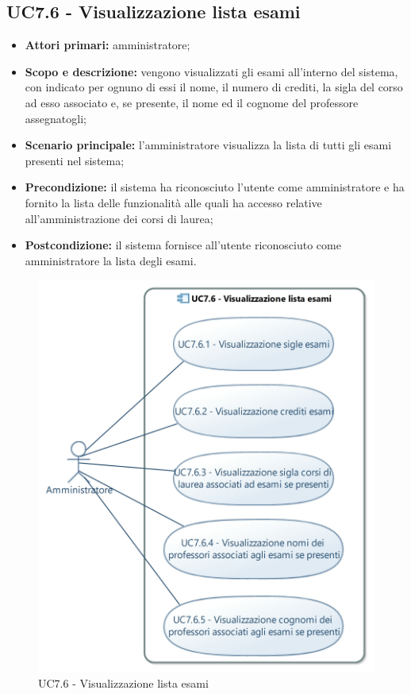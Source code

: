 \documentclass[AnalisiDeiRequisiti.tex]{subfiles}
\begin{document}
\subsection{UC7.6 - Visualizzazione lista esami}
\begin{itemize}
	\item \textbf{Attori primari:} amministratore;
	\item \textbf{Scopo e descrizione:} vengono visualizzati gli esami all'interno del sistema, con indicato per ognuno di essi il nome, il numero di crediti, la sigla del corso ad esso associato e, se presente, il nome ed il cognome del professore assegnatogli;
	\item \textbf{Scenario principale:} l'amministratore visualizza la lista di tutti gli esami presenti nel sistema;
	\item \textbf{Precondizione:} il sistema ha riconosciuto l'utente come amministratore e ha fornito la lista delle funzionalità alle quali ha accesso relative all'amministrazione dei corsi di laurea;
	\item \textbf{Postcondizione:} il sistema fornisce all'utente riconosciuto come amministratore la lista degli esami.
\end{itemize}
\begin{figure}[H]
	\centering
	\includegraphics[width=0.7\linewidth]{UC7_6.jpg}
	\caption{UC7.6 - Visualizzazione lista esami}
	\label{fig:UC7.6 - Visualizzazione lista esami}
\end{figure}
\end{document}
